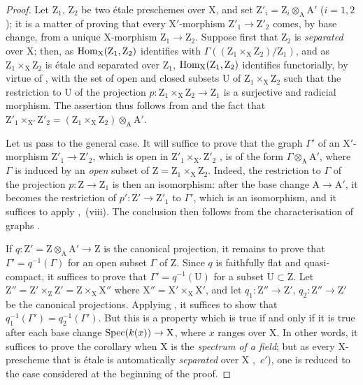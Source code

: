 \begin{proof}
Let $\mathrm{Z}_1$, $\mathrm{Z}_2$ be two \'{e}tale preschemes over X, and set $\mathrm{Z}'_i=\mathrm{Z}_i\otimes_{\mathrm{A}}\mathrm{A}'$ ($i=1,2$);
it is a matter of proving that every $\mathrm{X}'$-morphism $\mathrm{Z}'_1\to\mathrm{Z}'_2$ comes, by base change, from a unique X-morphism $\mathrm{Z}_1\to\mathrm{Z}_2$.
Suppose first that $\mathrm{Z}_2$ is \emph{separated} over X;
then, as $\operatorname{Hom}_{\mathrm{X}}(\mathrm{Z}_1,\mathrm{Z}_2)$ identifies with $\Gamma((\mathrm{Z}_1\times_{\mathrm{X}}\mathrm{Z}_2)/\mathrm{Z}_1)$, and as $\mathrm{Z}_1\times_{\mathrm{X}}\mathrm{Z}_2$ is \'{e}tale and separated over $\mathrm{Z}_1$, $\operatorname{Hom}_{\mathrm{X}}(\mathrm{Z}_1,\mathrm{Z}_2)$ identifies functorially, by virtue of , with the set of open and closed subsets U of $\mathrm{Z}_1\times_{\mathrm{X}}\mathrm{Z}_2$ such that the restriction to U of the projection $p:\mathrm{Z}_1\times_{\mathrm{X}}\mathrm{Z}_2\to\mathrm{Z}_1$ is a surjective and radicial morphism.
The assertion thus follows from  and the fact that $\mathrm{Z}'_1\times_{\mathrm{X}'}\mathrm{Z}'_2=(\mathrm{Z}_1\times_{\mathrm{X}}\mathrm{Z}_2)\otimes_{\mathrm{A}}\mathrm{A}'$.

Let us pass to the general case.
It will suffice to prove that the graph $\Gamma'$ of an $\mathrm{X}'$-morphism $\mathrm{Z}'_1\to\mathrm{Z}'_2$, which is open in $\mathrm{Z}'_1\times_{\mathrm{X}'}\mathrm{Z}'_2$ , is of the form $\Gamma\otimes_{\mathrm{A}}\mathrm{A}'$, where $\Gamma$ is induced by an \emph{open} subset of $\mathrm{Z}=\mathrm{Z}_1\times_{\mathrm{X}}\mathrm{Z}_2$.
Indeed, the restriction to $\Gamma$ of the projection $p:\mathrm{Z}\to\mathrm{Z}_1$ is then an isomorphism: after the base change $\mathrm{A}\to\mathrm{A}'$, it becomes the restriction of $p':\mathrm{Z}'\to\mathrm{Z}'_1$ to $\Gamma'$, which is an isomorphism, and it suffices to apply ,~(viii).
The conclusion then follows from the characterisation of graphs .

If $q:\mathrm{Z}'=\mathrm{Z}\otimes_{\mathrm{A}}\mathrm{A}'\to\mathrm{Z}$ is the canonical projection, it remains to prove that $\Gamma'=q^{-1}(\Gamma)$ for an open subset $\Gamma$ of Z.
Since $q$ is faithfully flat and quasi-compact, it suffices  to prove that $\Gamma'=q^{-1}(\mathrm{U})$ for a subset $\mathrm{U}\subset\mathrm{Z}$.
Let $\mathrm{Z}''=\mathrm{Z}'\times_{\mathrm{Z}}\mathrm{Z}'=\mathrm{Z}\times_{\mathrm{X}}\mathrm{X}''$ where $\mathrm{X}''=\mathrm{X}'\times_{\mathrm{X}}\mathrm{X}'$, and let $q_1:\mathrm{Z}''\to\mathrm{Z}'$, $q_2:\mathrm{Z}''\to\mathrm{Z}'$ be the canonical projections.
Applying , it suffices to show that $q_1^{-1}(\Gamma')=q_2^{-1}(\Gamma')$.
But this is a property which is true if and only if it is true after each base change $\operatorname{Spec}(k(x))\to\mathrm{X}$, where $x$ ranges over X.
In other words, it suffices to prove the corollary when X is the \emph{spectrum of a field};
but as every X-prescheme that is \'{e}tale is automatically \emph{separated} over X ,~$c'$), one is reduced to the case considered at the beginning of the proof.
\end{proof}

